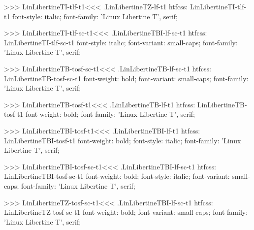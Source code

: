 {{{{{{{>>>
\<LinLibertineTI-tlf-t1\><<<
.LinLibertineTZ-lf-t1
htfcss:  LinLibertineTI-tlf-t1  font-style: italic; font-family: 'Linux Libertine T', serif;

>>>
\<LinLibertineTI-tlf-sc-t1\><<<
.LinLibertineTBI-lf-sc-t1
htfcss:  LinLibertineTI-tlf-sc-t1  font-style: italic; font-variant: small-caps; font-family: 'Linux Libertine T', serif;

>>>
\<LinLibertineTB-tosf-sc-t1\><<<
.LinLibertineTB-lf-sc-t1
htfcss:  LinLibertineTB-tosf-sc-t1  font-weight: bold; font-variant: small-caps; font-family: 'Linux Libertine T', serif;

>>>
\<LinLibertineTB-tosf-t1\><<<
.LinLibertineTB-lf-t1
htfcss:  LinLibertineTB-tosf-t1  font-weight: bold; font-family: 'Linux Libertine T', serif;

>>>
\<LinLibertineTBI-tosf-t1\><<<
.LinLibertineTBI-lf-t1
htfcss:  LinLibertineTBI-tosf-t1  font-weight: bold; font-style: italic; font-family: 'Linux Libertine T', serif;

>>>
\<LinLibertineTBI-tosf-sc-t1\><<<
.LinLibertineTBI-lf-sc-t1
htfcss:  LinLibertineTBI-tosf-sc-t1  font-weight: bold; font-style: italic; font-variant: small-caps; font-family: 'Linux Libertine T', serif;

>>>
\<LinLibertineTZ-tosf-sc-t1\><<<
.LinLibertineTBI-lf-sc-t1
htfcss:  LinLibertineTZ-tosf-sc-t1  font-weight: bold; font-variant: small-caps; font-family: 'Linux Libertine T', serif;

}}}}}}}
